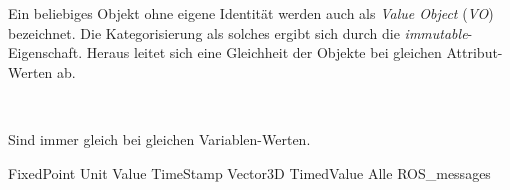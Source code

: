
Ein beliebiges Objekt ohne eigene Identität werden auch als \textit{Value Object} (\textit{VO}) bezeichnet.
Die Kategorisierung als solches ergibt sich durch die \textit{immutable}-Eigenschaft. Heraus leitet sich eine Gleichheit der Objekte bei gleichen Attribut-Werten ab.



\missing\

Sind immer gleich bei gleichen Variablen-Werten.

FixedPoint
Unit
Value
TimeStamp
Vector3D
TimedValue
Alle ROS\_messages


